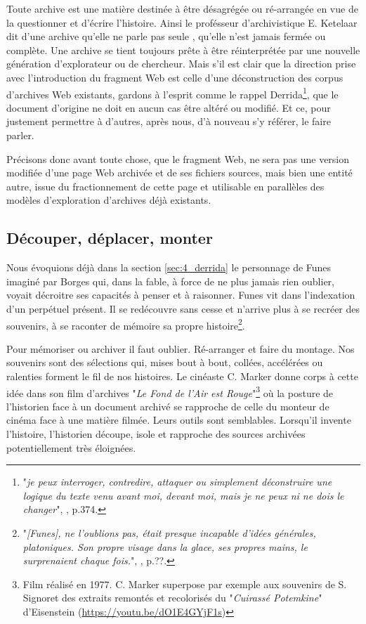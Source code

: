 \documentclass[symmetric,justified,marginals=raggedouter]{tufte-book}
\begin{document}
\par\noindent Toute archive est une matière destinée à être désagrégée ou ré-arrangée en vue de la questionner et d'écrire l'histoire. Ainsi le profésseur d'archivistique E. Ketelaar dit d'une archive qu'elle ne parle pas seule \citep{ketelaar_de_2006}, qu'elle n'est jamais fermée ou complète. Une archive se tient toujours prête à être réinterprétée par une nouvelle génération d'explorateur ou de chercheur. Mais s'il est clair que la direction prise avec l'introduction du fragment Web est celle d'une déconstruction des corpus d'archives Web existants, gardons à l'esprit comme le rappel Derrida\footnote{"\textit{je peux interroger, contredire, attaquer ou simplement déconstruire une logique du texte venu avant moi, devant moi, mais je ne peux ni ne dois le changer}", \citep{derrida_mal_1995}, p.374.}, que le document d'origine ne doit en aucun cas être altéré ou modifié. Et ce, pour justement permettre à d'autres, après nous, d'à nouveau s'y référer, le faire parler. 

Précisons donc avant toute chose, que le fragment Web, ne sera pas une version modifiée d'une page Web archivée et de ses fichiers sources, mais bien une entité autre, issue du fractionnement de cette page et utilisable en parallèles des modèles d'exploration d'archives déjà existants.    

\subsection{Découper, déplacer, monter}

\par\noindent Nous évoquions déjà dans la section \ref{sec:4_derrida} le personnage de Funes imaginé par Borges qui, dans la fable, à force de ne plus jamais rien oublier, voyait décroitre ses capacités à penser et à raisonner. Funes vit dans l'indexation d'un perpétuel présent. Il se redécouvre sans cesse et n'arrive plus à se recréer des souvenirs, à se raconter de mémoire sa propre histoire\footnote{"\textit{[Funes], ne l’oublions pas, était presque incapable d’idées générales, platoniques. Son propre visage dans la glace, ses propres mains, le surprenaient chaque fois.}", \citep{borges_fictions_1974}, p.??.}. 

Pour mémoriser ou archiver il faut oublier. Ré-arranger et faire du montage. Nos souvenirs sont des sélections qui, mises bout à bout, collées, accélérées ou ralenties forment le fil de nos histoires. Le cinéaste C. Marker donne corps à cette idée dans son film d'archives "\textit{Le Fond de l'Air est Rouge}"\footnote{Film réalisé en 1977. C. Marker superpose par exemple aux souvenirs de S. Signoret des extraits remontés et recolorisés du "\textit{Cuirassé Potemkine}" d'Eisenstein (\url{https://youtu.be/dO1E4GYjF1s})} où la posture de l'historien face à un document archivé se rapproche de celle du monteur de cinéma face à une matière filmée. Leurs outils sont semblables. Lorsqu'il invente l'histoire, l'historien découpe, isole et rapproche des sources archivées potentiellement très éloignées. 
\end{document}

